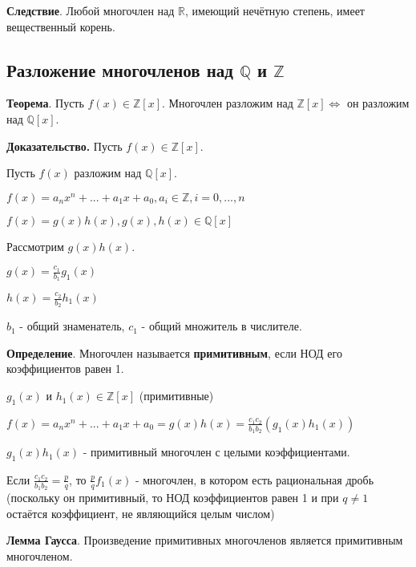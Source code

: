 \documentclass[a4paper]{article}
\begin{document}
\begin{htheorem}\textbf{Следствие}.
Любой многочлен над $\mathbb{R}$, имеющий нечётную степень, имеет вещественный корень.
\end{htheorem}

\subsection*{Разложение многочленов над $\mathbb{Q}$ и $\mathbb{Z}$}



\begin{htheorem}\textbf{Теорема}.
Пусть $f(x) \in \mathbb{Z}[x]$. Многочлен разложим над $\mathbb{Z}[x] \Leftrightarrow$ он разложим над $\mathbb{Q}[x]$.
\end{htheorem}

\begin{hproof}\textbf{Доказательство.}
Пусть $f(x) \in \mathbb{Z}[x]$.

Пусть $f(x)$ разложим над $\mathbb{Q}[x]$.

$f(x) = a_nx^n + ... + a_1x + a_0, a_i \in \mathbb{Z}, i = 0, ..., n$

$f(x) = g(x)h(x), g(x), h(x) \in \mathbb{Q}[x]$

Рассмотрим $g(x)h(x)$.

$\displaystyle g(x) = \frac{c_1}{b_1}g_1(x)$

$\displaystyle h(x) = \frac{c_2}{b_2}h_1(x)$

$b_1$ - общий знаменатель, $c_1$ - общий множитель в числителе.



\begin{htheorem}
\textbf{Определение}. Многочлен называется \textbf{примитивным}, если НОД его коэффициентов равен 1.
\end{htheorem}
$g_1(x)$ и $h_1(x) \in \mathbb{Z}[x]$ (примитивные)

$\displaystyle f(x) = a_nx^n + ... + a_1x + a_0 = g(x)h(x) = \frac{c_1c_2}{b_1b_2}(g_1(x)h_1(x))$

$g_1(x)h_1(x)$ - примитивный многочлен с целыми коэффициентами.

Если $\displaystyle \frac{c_1c_2}{b_1b_2} = \frac{p}{q}$, то $\displaystyle \frac{p}{q} f_1(x)$ - многочлен, в котором есть рациональная дробь (поскольку он примитивный, то НОД коэффициентов равен 1 и при $q \neq 1$ остаётся коэффициент, не являющийся целым числом)
\end{hproof}


\begin{htheorem}\textbf{Лемма Гаусса}.
Произведение примитивных многочленов является примитивным многочленом.
\end{htheorem}
\end{document}
